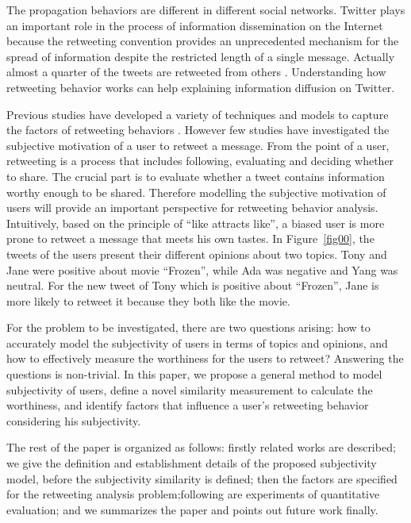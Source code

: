 \documentclass[letterpaper]{article}
\begin{document}
The propagation behaviors are different in different social networks. Twitter plays an important role in the process of information dissemination on the Internet because the retweeting convention provides an unprecedented mechanism for the spread of information despite the restricted length of a single message. 
Actually almost a quarter of the tweets are retweeted from others \cite{yang2010understanding}. 
Understanding how retweeting behavior works can help explaining information diffusion on Twitter. 

Previous studies have developed a variety of techniques and models to capture the factors of retweeting behaviors \cite{macskassy2011people,feng2013retweet}. However few studies have investigated the subjective motivation of a user to retweet a message. 
From the point of a user, retweeting is a process that includes following, evaluating and deciding whether to share. The crucial part is to evaluate whether a tweet contains information worthy enough to be shared.  
Therefore modelling the subjective motivation of users will provide an important perspective for retweeting behavior analysis. 
Intuitively, based on the principle of ``like attracts like'', a biased user is more prone to retweet a message that meets his own tastes. In Figure~\ref{fig00}, the tweets of the users present their different opinions about two topics. Tony and Jane were positive about movie ``Frozen'', while Ada was negative and Yang was neutral. For the new tweet of Tony which is positive about ``Frozen'', Jane is more likely to retweet it because they both like the movie. 

For the problem to be investigated, there are two questions arising: how to accurately model the subjectivity of users in terms of topics and opinions, and how to effectively measure the worthiness for the users to retweet? 
Answering the questions is non-trivial. 
In this paper, we propose a general method to model subjectivity of users, define a novel similarity measurement to calculate the worthiness,  and identify factors that influence a user's retweeting behavior considering his subjectivity. 

The rest of the paper is organized as follows: firstly related works are described; we give the definition and establishment details of the proposed subjectivity model, before the subjectivity similarity is defined; then the factors are specified for the retweeting analysis problem;following are experiments of quantitative evaluation; and we summarizes the paper and points out future work finally.
\end{document}
